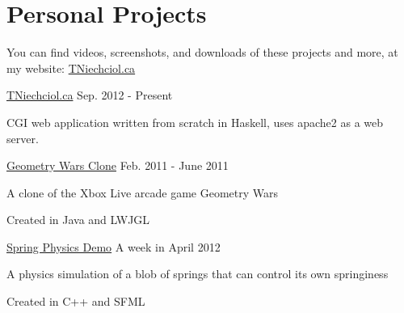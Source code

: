 \documentclass[10pt,letterpaper]{article}
\begin{document}
\section*{Personal Projects}
    \begin{description}
        \item You can find videos, screenshots, and downloads of these projects and more, at my website: \href{http://TNiechciol.ca}{TNiechciol.ca}
        \item \href{https://github.com/TerranceN/UWaterloo-Student-Website}{TNiechciol.ca}
        \hfill Sep. 2012 - Present
        \begin{description}
            \item CGI web application written from scratch in Haskell, uses apache2 as a web server.
        \end{description}
        \item \href{http://tniechciol.ca/Projects/GeoWarsClone/}{Geometry Wars Clone}
        \hfill Feb. 2011 - June 2011
        \begin{description}
            \item A clone of the Xbox Live arcade game Geometry Wars
            \item Created in Java and LWJGL
        \end{description}
        \item \href{http://tniechciol.ca/Projects/SpringPhysics/}{Spring Physics Demo}
        \hfill A week in April 2012
        \begin{description}
            \item A physics simulation of a blob of springs that can control its own springiness
            \item Created in C++ and SFML
        \end{description}
    \end{description}
\end{document}
